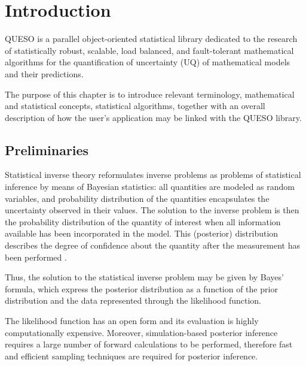 \chapter{Introduction}\label{ch-introduction}
\thispagestyle{headings}

QUESO is a parallel object-oriented statistical library dedicated to the research of statistically robust, scalable, load balanced, and fault-tolerant mathematical algorithms for the quantification of uncertainty (UQ) of mathematical models and their predictions. 


The purpose of this chapter is to introduce relevant terminology, mathematical and statistical concepts, statistical algorithms, together with an overall description of how the user's application may be linked with the QUESO library.



\section{Preliminaries}


Statistical inverse theory reformulates inverse problems as problems of statistical inference by means of Bayesian statistics: all quantities are modeled as random variables, and probability distribution of the quantities encapsulates the uncertainty observed in their values. The solution to the inverse problem is then the probability distribution of the quantity of interest when all information available has been incorporated in the model. This (posterior) distribution describes the degree of confidence about the quantity after the measurement has been performed \cite{KaSo05}.

Thus, the solution to the statistical inverse problem may be given by Bayes' formula, which express the posterior distribution as a function of the prior distribution and the data represented through the likelihood function.

The likelihood function has an open form and its evaluation is highly computationally expensive.  Moreover, simulation-based posterior inference requires a large number of forward calculations to be performed, therefore fast and efficient sampling techniques are required for posterior inference.

